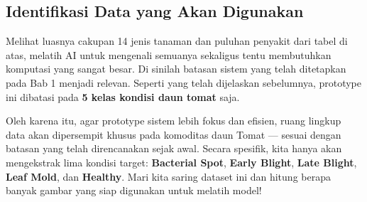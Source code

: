 \subsection{Identifikasi Data yang Akan Digunakan}

Melihat luasnya cakupan 14 jenis tanaman dan puluhan penyakit dari tabel di atas, melatih AI untuk mengenali semuanya sekaligus tentu membutuhkan komputasi yang sangat besar. Di sinilah batasan sistem yang telah ditetapkan pada Bab 1 menjadi relevan. Seperti yang telah dijelaskan sebelumnya, prototype ini dibatasi pada \textbf{5 kelas kondisi daun tomat} saja.

Oleh karena itu, agar prototype sistem lebih fokus dan efisien, ruang lingkup data akan dipersempit khusus pada komoditas daun Tomat --- sesuai dengan batasan yang telah direncanakan sejak awal. Secara spesifik, kita hanya akan mengekstrak lima kondisi target: \textbf{Bacterial Spot}, \textbf{Early Blight}, \textbf{Late Blight}, \textbf{Leaf Mold}, dan \textbf{Healthy}. Mari kita saring dataset ini dan hitung berapa banyak gambar yang siap digunakan untuk melatih model!

